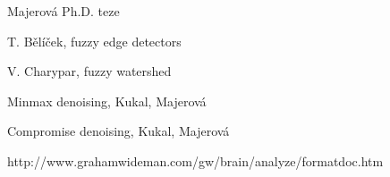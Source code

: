 \begin{thebibliography}{9}
        Majerová Ph.D. teze

        T. Bělíček, fuzzy edge detectors

        V. Charypar, fuzzy watershed

        Minmax denoising, Kukal, Majerová

        Compromise denoising, Kukal, Majerová
        
        http://www.grahamwideman.com/gw/brain/analyze/formatdoc.htm

\end{thebibliography} 
